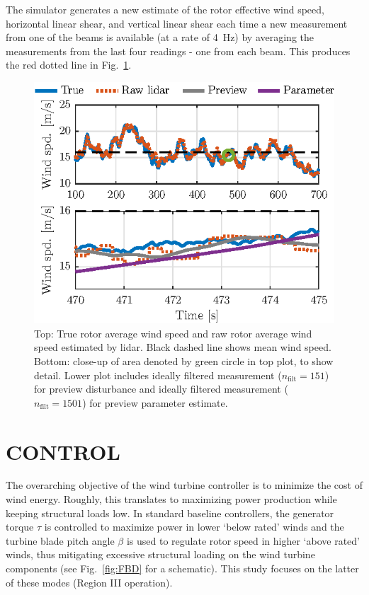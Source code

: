 \documentclass[letterpaper, 10 pt, conference]{ieeeconf}  %
\begin{document}
The simulator generates a new estimate of the rotor effective wind speed, horizontal linear shear, and vertical linear shear each time a new measurement from one of the beams is available (at a rate of 4~Hz) by averaging the measurements from the last four readings - one from each beam. This produces the red dotted line in Fig.~\ref{fig:lidarmeas}.
\begin{figure}[thbp]
	\centering
	\includegraphics[trim=0 0 0 -5 , clip, scale=1.0]{LidarMeas.eps}
	\caption{Top: True rotor average wind speed and raw rotor average wind speed estimated by lidar. Black dashed line shows mean wind speed. Bottom: close-up of area denoted by green circle in top plot, to show detail. Lower plot includes ideally filtered measurement ($n_\mathrm{filt} = 151$) for preview disturbance and ideally filtered measurement ($n_\mathrm{filt} = 1501$) for preview parameter estimate.}
	\label{fig:lidarmeas}
\end{figure}

\section{CONTROL}\label{sec:Control}
The overarching objective of the wind turbine controller is to minimize the cost of wind energy. Roughly, this translates to maximizing power production while keeping structural loads low. In standard baseline controllers, the generator torque $\tau$ is controlled to maximize power in lower `below rated' winds and the turbine blade pitch angle $\beta$ is used to regulate rotor speed in higher `above rated' winds, thus mitigating excessive structural loading on the wind turbine components (see Fig.~\ref{fig:FBD} for a schematic). This study focuses on the latter of these modes (Region III operation). 
\end{document}
